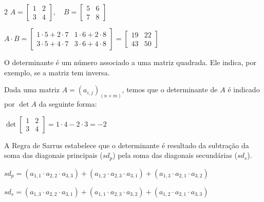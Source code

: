 \documentclass[12pt]{article}
\begin{document}
\begin{multicols}{2}
$
A = \begin{bmatrix} 1 & 2 \\ 3 & 4 \end{bmatrix},\quad
B = \begin{bmatrix} 5 & 6 \\ 7 & 8 \end{bmatrix}$

$A \cdot B = \begin{bmatrix}
1\cdot5 + 2\cdot7 & 1\cdot6 + 2\cdot8 \\
3\cdot5 + 4\cdot7 & 3\cdot6 + 4\cdot8
\end{bmatrix}
=
\begin{bmatrix}
19 & 22 \\
43 & 50
\end{bmatrix}
$


O determinante é um número associado a uma matriz quadrada. Ele indica, por exemplo, se a matriz tem inversa.

\vspace{0.3cm}

Dada uma matriz $A=(a_{i,j})_{(n\times m)}$, temos que o determinante de $A$ é indicado por $\det A$ da seguinte forma:


\vspace{0.3cm}

$
\det \begin{bmatrix} 1 & 2 \\ 3 & 4 \end{bmatrix} = 1\cdot4 - 2\cdot3 = -2
$

\vspace{0.3cm}

A Regra de Sarrus estabelece que o determinante é resultado da subtração da soma das diagonais principais ($sd_p$) pela soma das diagonais secundárias ($sd_s$).


\footnotesize
$sd_p=(a_{1,1} \cdot a_{2,2} \cdot a_{3,3})+(a_{1,2} \cdot a_{2,3} \cdot a_{3,1})+(a_{1,3} \cdot a_{2,1} \cdot a_{3,2})$

$sd_s=(a_{1,3} \cdot a_{2,2} \cdot a_{3,1})+(a_{1,1} \cdot a_{2,3} \cdot a_{3,2})+(a_{1,2} \cdot a_{2,1} \cdot a_{3,3})$
\normalsize

\vspace{0.3cm}


\end{multicols}
\end{document}
